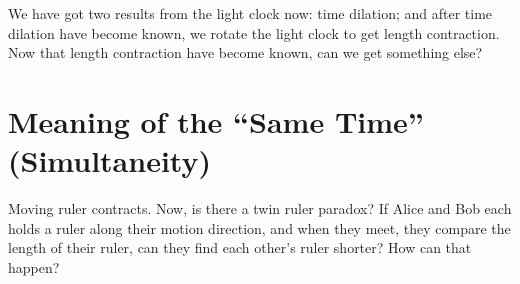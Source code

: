 


We have got two results from the light clock now: time dilation; and after time dilation have become known, we rotate the light clock to get length contraction. Now that length contraction have become known, can we get something else?

\section{Meaning of the ``Same Time'' (Simultaneity)} \label{sec:same-time}

Moving ruler contracts. Now, is there a twin ruler paradox? If Alice and Bob each holds a ruler along their motion direction, and when they meet, they compare the length of their ruler, can they find each other's ruler shorter? How can that happen?

